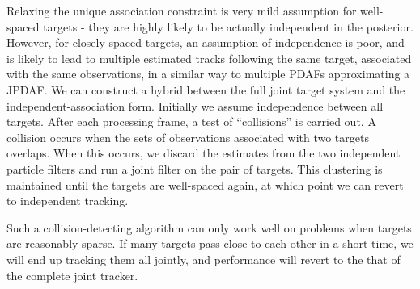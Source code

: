 Relaxing the unique association constraint is very mild assumption for well-spaced targets - they are highly likely to be actually independent in the posterior. However, for closely-spaced targets, an assumption of independence is poor, and is likely to lead to multiple estimated tracks following the same target, associated with the same observations, in a similar way to multiple PDAFs approximating a JPDAF. We can construct a hybrid between the full joint target system and the independent-association form. Initially we assume independence between all targets. After each processing frame, a test of ``collisions'' is carried out. A collision occurs when the sets of observations associated with two targets overlaps. When this occurs, we discard the estimates from the two independent particle filters and run a joint filter on the pair of targets. This clustering is maintained until the targets are well-spaced again, at which point we can revert to independent tracking.

Such a collision-detecting algorithm can only work well on problems when targets are reasonably sparse. If many targets pass close to each other in a short time, we will end up tracking them all jointly, and performance will revert to the that of the complete joint tracker.


